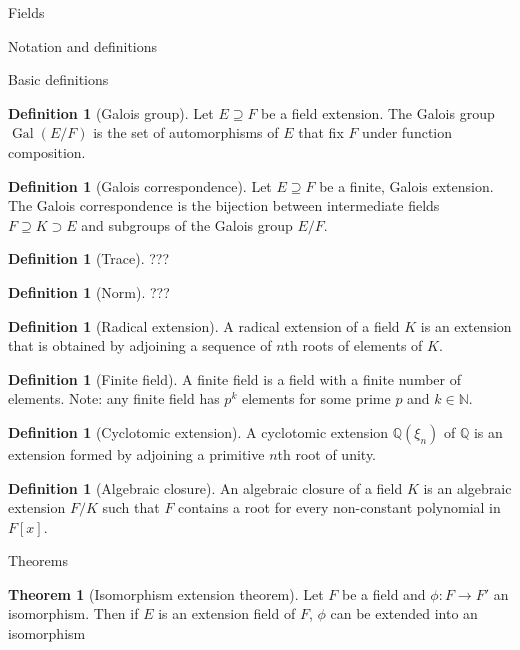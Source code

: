 \documentclass{article}
\theoremstyle{definition}
\newtheorem{theorem}{Theorem}
\numberwithin{theorem}{subsection} %
\theoremstyle{remark}
\theoremstyle{definition}
\newtheorem{definition}[paragraph]{Definition}
\newcommand{\Gal}{\operatorname{Gal}}
\newcommand{\Q}{\mathbb Q}
\newcommand{\fn}[3]{{#1 \colon #2 \rightarrow #3}}
\begin{document}
\begin{section}{Fields}
\begin{subsection}{Notation and definitions}
\begin{subsubsection}{Basic definitions}
      \begin{definition}[Galois group]
        Let $E \supseteq F$ be a field extension. The Galois group $\Gal(E/F)$
        is the set of automorphisms of $E$ that fix $F$ under function
        composition.
      \end{definition}
      \begin{definition}[Galois correspondence]
        Let $E \supseteq F$ be a finite, Galois extension.
        The Galois correspondence is the bijection between intermediate fields
        $F \supseteq K \supset E$ and subgroups of the Galois group $E/F$.
      \end{definition}
      \begin{definition}[Trace]
        ???
      \end{definition}
      \begin{definition}[Norm]
        ???
      \end{definition}
      \begin{definition}[Radical extension]
        A radical extension of a field $K$ is an extension that is obtained by
        adjoining a sequence of $n$th roots of elements of $K$.
      \end{definition}
      \begin{definition}[Finite field]
        A finite field is a field with a finite number of elements.
        Note: any finite field has $p^k$ elements for some prime $p$ and
        $k \in \mathbb N$.
      \end{definition}
      \begin{definition}[Cyclotomic extension]
        A cyclotomic extension $\Q(\xi_n)$ of $\Q$ is an extension formed by
        adjoining a primitive $n$th root of unity.
      \end{definition}
      \begin{definition}[Algebraic closure]
        An algebraic closure of a field $K$ is an algebraic extension $F/K$
        such that $F$ contains a root for every non-constant polynomial in
        $F[x]$.
      \end{definition}
    \end{subsubsection}
  \end{subsection}
  \begin{subsection}{Theorems}
    \begin{theorem}[Isomorphism extension theorem]
      Let $F$ be a field and $\fn \phi F {F'}$ an isomorphism. Then if $E$ is an
      extension field of $F$, $\phi$ can be extended into an isomorphism

\end{theorem}
\end{subsection}
\end{section}
\end{document}
